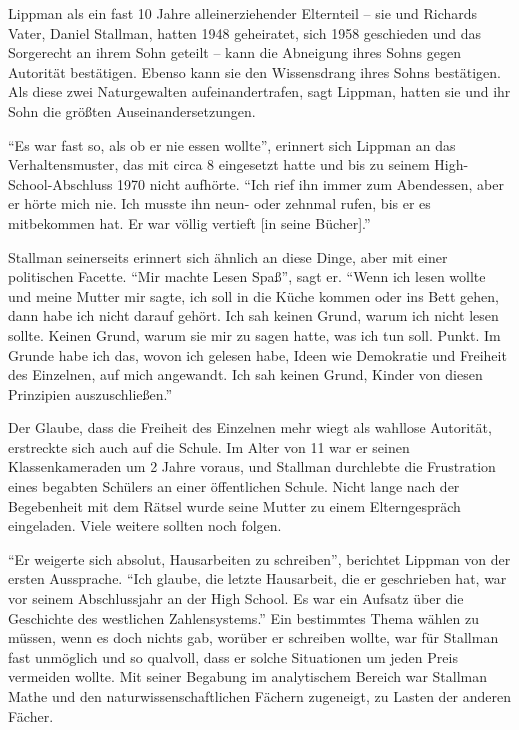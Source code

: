 Lippman als ein fast 10 Jahre alleinerziehender Elternteil – sie und Richards Vater, Daniel Stallman, hatten 1948 geheiratet, sich 1958 geschieden und das Sorgerecht an ihrem Sohn geteilt – kann die Abneigung ihres Sohns gegen Autorität bestätigen. Ebenso kann sie den Wissensdrang ihres Sohns bestätigen. Als  diese zwei Naturgewalten aufeinandertrafen, sagt Lippman, hatten sie und ihr Sohn die größten Auseinandersetzungen. 

"`Es war fast so, als ob er nie essen wollte"', erinnert sich Lippman an das Verhaltensmuster, das mit circa 8 eingesetzt hatte und bis zu seinem High-School-Abschluss 1970 nicht aufhörte. "`Ich rief ihn immer zum Abendessen, aber er hörte mich nie. Ich musste ihn neun- oder zehnmal rufen, bis er es mitbekommen hat. Er war völlig vertieft [in seine Bücher]."'

Stallman seinerseits erinnert sich ähnlich an diese Dinge, aber mit einer politischen Facette. "`Mir machte Lesen Spaß"', sagt er. "`Wenn ich lesen wollte und meine Mutter mir sagte, ich soll in die Küche kommen oder ins Bett gehen, dann habe ich nicht darauf gehört. Ich sah keinen Grund, warum ich nicht lesen sollte. Keinen Grund, warum sie mir zu sagen hatte, was ich tun soll. Punkt. Im Grunde habe ich das, wovon ich gelesen habe, Ideen wie Demokratie und Freiheit des Einzelnen, auf mich angewandt. Ich sah keinen Grund, Kinder von diesen Prinzipien auszuschließen."'

Der Glaube, dass die Freiheit des Einzelnen mehr wiegt als wahllose Autorität, erstreckte sich auch auf die Schule. Im Alter von 11 war er seinen Klassenkameraden um 2 Jahre voraus, und Stallman durchlebte die Frustration eines begabten Schülers an einer öffentlichen Schule. Nicht lange nach der Begebenheit mit dem Rätsel wurde seine Mutter zu einem Elterngespräch eingeladen. Viele weitere sollten noch folgen.

"`Er weigerte sich absolut, Hausarbeiten zu schreiben"', berichtet Lippman von der ersten Aussprache. "`Ich glaube, die letzte Hausarbeit, die er geschrieben hat, war vor seinem Abschlussjahr an der High School. Es war ein Aufsatz über die Geschichte des westlichen Zahlensystems."' Ein bestimmtes Thema wählen zu müssen, wenn es doch nichts gab, worüber er schreiben wollte, war für Stallman fast unmöglich und so qualvoll, dass er solche Situationen um jeden Preis vermeiden wollte. Mit seiner Begabung im analytischem Bereich war Stallman Mathe und den naturwissenschaftlichen Fächern zugeneigt, zu Lasten der anderen Fächer.

